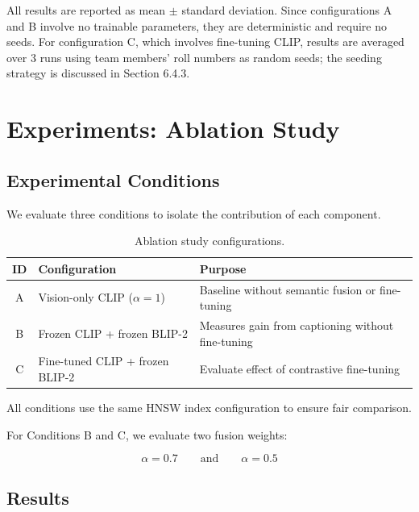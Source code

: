 \documentclass[12pt,a4paper]{article}
\begin{document}
All results are reported as mean $\pm$ standard deviation.
Since configurations A and B involve no trainable parameters,
they are deterministic and require no seeds.
For configuration C, which involves fine-tuning CLIP,
results are averaged over 3 runs using team members'
roll numbers as random seeds; the seeding strategy
is discussed in Section 6.4.3.
\section{Experiments: Ablation Study}

\subsection{Experimental Conditions}

We evaluate three conditions to isolate the contribution of each component.

\begin{table}[H]
\centering
\caption{Ablation study configurations.}
\begin{tabular}{clp{7cm}}
\toprule
\textbf{ID} & \textbf{Configuration} & \textbf{Purpose} \\
\midrule
A &
Vision-only CLIP ($\alpha = 1$)
&
Baseline without semantic fusion or fine-tuning
\\

B &
Frozen CLIP + frozen BLIP-2
&
Measures gain from captioning without
fine-tuning
\\

C &
Fine-tuned CLIP + frozen BLIP-2
&
Evaluate effect of contrastive fine-tuning
\\

\bottomrule
\end{tabular}
\end{table}

All conditions use the same HNSW index configuration to ensure fair
comparison.

For Conditions B and C, we evaluate two fusion weights:

\[
\alpha = 0.7
\qquad
\text{and}
\qquad
\alpha = 0.5
\]

\subsection{Results}
\end{document}
